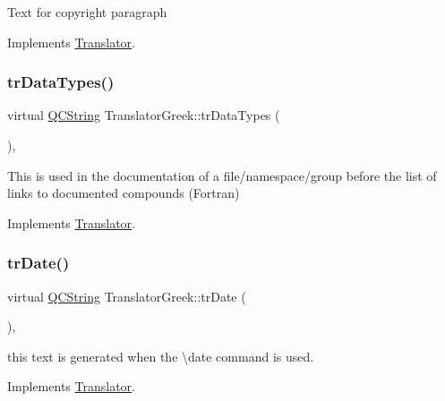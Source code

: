 Text for copyright paragraph 

Implements \mbox{\hyperlink{class_translator}{Translator}}.

\mbox{\label{class_translator_greek_a449e141ff0362337ca545fd1aa3f27f0}} 
\subsubsection{\texorpdfstring{trDataTypes()}{trDataTypes()}}
{\footnotesize\ttfamily virtual \mbox{\hyperlink{class_q_c_string}{Q\+C\+String}} Translator\+Greek\+::tr\+Data\+Types (\begin{DoxyParamCaption}{ }\end{DoxyParamCaption})\hspace{0.3cm}{\ttfamily [inline]}, {\ttfamily [virtual]}}

This is used in the documentation of a file/namespace/group before the list of links to documented compounds (Fortran) 

Implements \mbox{\hyperlink{class_translator}{Translator}}.

\mbox{\label{class_translator_greek_a66b91d2c8c37e0d31c33e4e66788e0a7}} 
\subsubsection{\texorpdfstring{trDate()}{trDate()}}
{\footnotesize\ttfamily virtual \mbox{\hyperlink{class_q_c_string}{Q\+C\+String}} Translator\+Greek\+::tr\+Date (\begin{DoxyParamCaption}{ }\end{DoxyParamCaption})\hspace{0.3cm}{\ttfamily [inline]}, {\ttfamily [virtual]}}

this text is generated when the \textbackslash{}date command is used. 

Implements \mbox{\hyperlink{class_translator}{Translator}}.

\mbox{\label{class_translator_greek_a3570152536e37ff51b9c660f72c27d4f}} 

